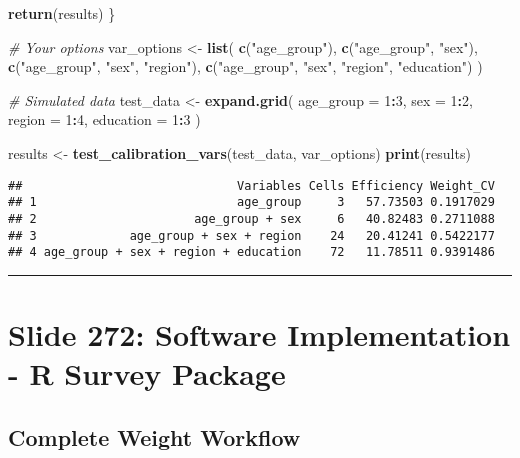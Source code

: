 \documentclass[
]{article}
\newenvironment{Shaded}{\begin{snugshade}}{\end{snugshade}}
\newcommand{\AttributeTok}[1]{\textcolor[rgb]{0.13,0.29,0.53}{#1}}
\newcommand{\CommentTok}[1]{\textcolor[rgb]{0.56,0.35,0.01}{\textit{#1}}}
\newcommand{\DecValTok}[1]{\textcolor[rgb]{0.00,0.00,0.81}{#1}}
\newcommand{\FunctionTok}[1]{\textcolor[rgb]{0.13,0.29,0.53}{\textbf{#1}}}
\newcommand{\NormalTok}[1]{#1}
\newcommand{\OtherTok}[1]{\textcolor[rgb]{0.56,0.35,0.01}{#1}}
\newcommand{\SpecialCharTok}[1]{\textcolor[rgb]{0.81,0.36,0.00}{\textbf{#1}}}
\newcommand{\StringTok}[1]{\textcolor[rgb]{0.31,0.60,0.02}{#1}}
\begin{document}
\begin{Shaded}
\begin{Highlighting}[]
  \FunctionTok{return}\NormalTok{(results)}
\NormalTok{\}}

\CommentTok{\# Your options}
\NormalTok{var\_options }\OtherTok{\textless{}{-}} \FunctionTok{list}\NormalTok{(}
  \FunctionTok{c}\NormalTok{(}\StringTok{"age\_group"}\NormalTok{),}
  \FunctionTok{c}\NormalTok{(}\StringTok{"age\_group"}\NormalTok{, }\StringTok{"sex"}\NormalTok{),}
  \FunctionTok{c}\NormalTok{(}\StringTok{"age\_group"}\NormalTok{, }\StringTok{"sex"}\NormalTok{, }\StringTok{"region"}\NormalTok{),}
  \FunctionTok{c}\NormalTok{(}\StringTok{"age\_group"}\NormalTok{, }\StringTok{"sex"}\NormalTok{, }\StringTok{"region"}\NormalTok{, }\StringTok{"education"}\NormalTok{)}
\NormalTok{)}

\CommentTok{\# Simulated data}
\NormalTok{test\_data }\OtherTok{\textless{}{-}} \FunctionTok{expand.grid}\NormalTok{(}
  \AttributeTok{age\_group =} \DecValTok{1}\SpecialCharTok{:}\DecValTok{3}\NormalTok{,}
  \AttributeTok{sex =} \DecValTok{1}\SpecialCharTok{:}\DecValTok{2}\NormalTok{,}
  \AttributeTok{region =} \DecValTok{1}\SpecialCharTok{:}\DecValTok{4}\NormalTok{,}
  \AttributeTok{education =} \DecValTok{1}\SpecialCharTok{:}\DecValTok{3}
\NormalTok{)}

\NormalTok{results }\OtherTok{\textless{}{-}} \FunctionTok{test\_calibration\_vars}\NormalTok{(test\_data, var\_options)}
\FunctionTok{print}\NormalTok{(results)}
\end{Highlighting}
\end{Shaded}

\begin{verbatim}
##                              Variables Cells Efficiency Weight_CV
## 1                            age_group     3   57.73503 0.1917029
## 2                      age_group + sex     6   40.82483 0.2711088
## 3             age_group + sex + region    24   20.41241 0.5422177
## 4 age_group + sex + region + education    72   11.78511 0.9391486
\end{verbatim}

\begin{center}\rule{0.5\linewidth}{0.5pt}\end{center}

\section{Slide 272: Software Implementation - R Survey
Package}\label{slide-272-software-implementation---r-survey-package}

\subsection{Complete Weight Workflow}\label{complete-weight-workflow}
\end{document}
